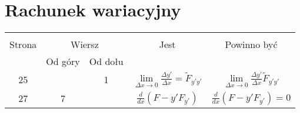\documentclass[a4paper,11pt]{article}
\begin{document}
\vspace{\spaceTwo}










\newpage
\section{Rachunek wariacyjny}

\vspace{\spaceTwo}







\begin{center}

  \begin{tabular}{|c|c|c|c|c|}
    \hline
    & \multicolumn{2}{c|}{} & & \\
    Strona & \multicolumn{2}{c|}{Wiersz} & Jest
                              & Powinno być \\ \cline{2-3}
    & Od góry & Od dołu & & \\
    \hline
    25  & &  1 & $\lim\limits_{ \Delta x \to 0 }
                 \frac{ \Delta y' }{ \Delta x } = \tilde{ F }_{ y' y' }$
           & $\lim\limits_{ \Delta x \to 0 }
             \frac{ \Delta y' }{ \Delta x } \tilde{ F }_{ y' y' }$ \\
    27  &  7 & & $\frac{ d }{ dx }( F - y' F_{ y' } )$
           & $\frac{ d }{ dx }( F - y' F_{ y' } ) = 0$ \\
    \hline
  \end{tabular}

\end{center}

\vspace{\spaceTwo}










\end{document}
